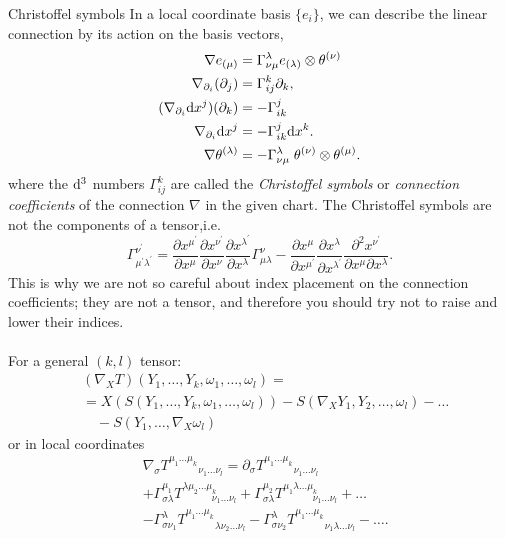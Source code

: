 \begin{mybox}{Christoffel symbols}
	In a local coordinate basis $\{e_i\}$, we can describe the linear connection by its action on the basis vectors,
	\begin{align}
		\nabla e_{(\mu)} &= \Gamma^\lambda_{\nu \mu} e_{(\lambda)} \otimes \theta^{(\nu)}\\
		\nabla_{\partial_i} (\partial_j) &= \Gamma^k_{ij} \partial_k,\\
		(\nabla_{\partial_i} \mathrm{d} x^j)(\partial_k)& = - \Gamma^j_{ik}\\
		\nabla_{\partial_i} \mathrm{d} x^j &= - \Gamma^j_{ik} \mathrm{d} x^k.\\
		\nabla \theta^{(\lambda)} &= - \Gamma^{\lambda}_{\nu \mu} \; \theta^{(\nu)} \otimes \theta^{(\mu)}.
	\end{align}
	where the $\mathrm{d}^3$ numbers $\Gamma^k_{ij}$ are called the \emph{Christoffel symbols} or \emph{connection coefficients} of the connection $\nabla$ in the given chart. The Christoffel symbols are not the components of a tensor,i.e.
	\begin{equation}
	\label{eq:christoffelTrafo}
		\Gamma^{\nu^\prime}_{\mu^\prime \lambda^\prime} = \frac{\partial x^{\mu^\prime}}{\partial x^{\mu}} \frac{\partial x^{\nu^\prime}}{\partial x^{\nu}} \frac{\partial x^{\lambda^\prime}}{\partial x^\lambda} \Gamma^{\nu}_{\mu \lambda} - \frac{\partial x^\mu}{\partial x^{\mu^\prime}}\frac{\partial x^\lambda}{\partial x^{\lambda^\prime}} \frac{\partial^2 x^{\nu^\prime}}{\partial x^\mu \partial x^\lambda}.
	\end{equation} 
	This is why we are not so careful about index placement on the
	connection coefficients; they are not a tensor, and therefore you should try not to raise and
	lower their indices.
	\\
	\\
	For a general $(k,l)$ tensor:
	\begin{align}
		&(\nabla_X T)(Y_1,\dots,Y_k,\omega_1,\dots,\omega_l)=\\
		&=X(S(Y_1,\dots,Y_k,\omega_1,\dots,\omega_l)) - S(\nabla_XY_1,Y_2,\dots,\omega_l) - \dots \nonumber \\
		& \quad - S(Y_1,\dots,\nabla_X\omega_l)
	\end{align}
or in local coordinates
	\begin{align}
		& \nabla_\sigma T^{\mu_1 \dots \mu_k}_{\quad \quad \quad \nu_1 \dots \nu_l} = \partial_\sigma T^{\mu_1 \dots \mu_k}_{\quad \quad \quad \nu_1 \dots \nu_l} \\
		& +\Gamma^{\mu_1}_{\sigma \lambda} T^{\lambda \mu_2 \dots \mu_k}_{\quad \quad \quad \nu_1 \dots \nu_l} + \Gamma^{\mu_2}_{\sigma \lambda} T^{\mu_1\lambda \dots \mu_k}_{\quad \quad \quad \nu_1 \dots \nu_l} + \dots \nonumber \\
		&- \Gamma^\lambda_{\sigma \nu_1} T^{\mu_1 \dots \mu_k}_{\quad \quad \quad \lambda \nu_2 \dots \nu_l}-\Gamma^\lambda_{\sigma \nu_2} T^{\mu_1 \dots \mu_k}_{\quad \quad \quad \nu_1 \lambda \dots \nu_l} - \dots \nonumber.
	\end{align}
\end{mybox}
